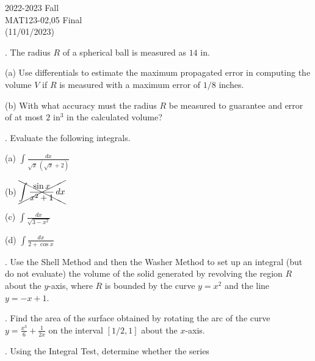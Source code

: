\documentclass{article}
\begin{document}
\pagestyle{empty}
\large

\begin{center}
2022-2023 Fall \\MAT123-02,05 Final\\(11/01/2023)
\end{center}

. The radius $R$ of a spherical ball is measured as $14$ in.

\hfill

\noindent (a) Use differentials to estimate the maximum propagated error in computing the volume $V$ if $R$ is measured with a maximum error of $1/8$ inches.

\hfill

\noindent (b) With what accuracy must the radius $R$ be measured to guarantee and error of at most $2$ in$^3$ in the calculated volume?

\hfill

. Evaluate the following integrals.

\hfill

\noindent (a) $\displaystyle\int\frac{dx}{\sqrt x\,\left(\sqrt x+2\right)}$

\hfill

\hfill

\noindent (b) $\xcancel{\displaystyle\int\frac{\sin x}{x^2+1}\,dx}$

\hfill

\hfill

\noindent (c) $\displaystyle\int\frac{dx}{\sqrt{3-x^2}}$

\hfill

\hfill

\noindent (d) $\displaystyle\int\frac{dx}{2+\cos x}$

\hfill

. Use the Shell Method and then the Washer Method to set up an integral (but do not evaluate) the volume of the solid generated by revolving the region $R$ about the $y$-axis, where $R$ is bounded by the curve $y=x^2$ and the line $y=-x+1$.

\hfill

. Find the area of the surface obtained by rotating the arc of the curve $\displaystyle y=\frac{x^3}6+\frac1{2x}$ on the interval $[1/2,1]$ about the $x$-axis.

\hfill

. Using the Integral Test, determine whether the series

\hfill
\end{document}
